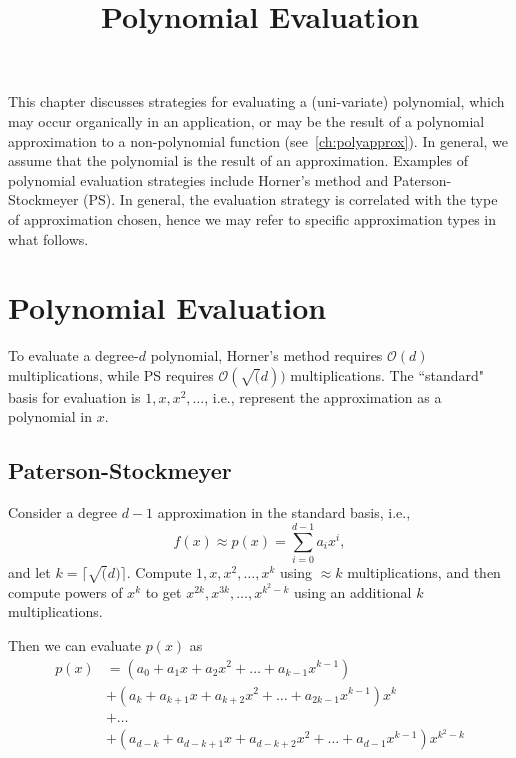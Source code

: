 \documentclass[../fheimpl.tex]{subfiles}
\begin{document}
	\ifcompileasbook
	\else
	\title{Polynomial Evaluation}
	\hypersetup{pageanchor=false}
	\maketitle
	\listoffixmes
	\tableofcontents
	\compileasbooktrue
	\hypersetup{pageanchor=true}
	\fi
	
	This chapter discusses strategies for evaluating a (uni-variate) polynomial, which may occur organically in an application, or may be the result of a polynomial approximation to a non-polynomial function (see~\cref{ch:polyapprox}). In general, we assume that the polynomial is the result of an approximation. Examples of polynomial evaluation strategies include Horner's method and Paterson-Stockmeyer (PS). 
	In general, the evaluation strategy is correlated with the type of approximation chosen, hence we may refer to specific approximation types in what follows.
	
	
	\section{Polynomial Evaluation}
	To evaluate a degree-$d$ polynomial, Horner's method requires $\mathcal{O}(d)$ multiplications, while PS requires $\mathcal{O}(\sqrt(d))$ multiplications. The ``standard" basis for evaluation is ${1, x, x^2, \ldots}$, i.e., represent the approximation as a polynomial in $x$.
	
	\subsection{Paterson-Stockmeyer}
	Consider a degree $d-1$ approximation in the standard basis, i.e.,
	\[f(x)\approx p(x) = \sum_{i=0}^{d-1} a_ix^i,\] 
	and let $k=\lceil\sqrt(d)\rceil$. Compute $1, x, x^2, \ldots, x^{k}$ using $\approx k$ multiplications, and then compute powers of $x^k$ to get $x^{2k}, x^{3k}, \ldots, x^{k^2-k}$ using an additional $k$ multiplications.
	
	Then we can evaluate $p(x)$ as
	\begin{align*}
		p(x) & = (a_0 + a_1x + a_2x^2 + \ldots + a_{k-1}x^{k-1}) \\
		& + (a_k + a_{k+1}x + a_{k+2}x^2 + \ldots + a_{2k-1}x^{k-1})x^k \\
		& + \ldots \\
		& + (a_{d-k} + a_{d-k+1}x + a_{d-k+2}x^2 + \ldots + a_{d-1}x^{k-1})x^{k^2-k}
	\end{align*}
	
\end{document}

